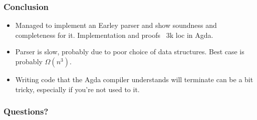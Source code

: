 \begin{frame}
	\frametitle{Conclusion}
	\begin{itemize}
		
		\item
			
			Managed to implement an Earley parser and show soundness and
			completeness for it. Implementation and proofs ~3k loc in Agda.
		
		\item
			
			Parser is slow, probably due to poor choice of data structures.
			Best case is probably $\Omega(n^3)$.
		
		\item

			Writing code that the Agda compiler understands will terminate can 
			be a bit tricky, especially if you're not used to it.

	\end{itemize}
\end{frame}

\begin{frame}
	\frametitle{Questions?}
\end{frame}
